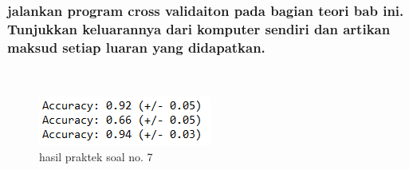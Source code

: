 \subsubsection{jalankan program cross validaiton pada bagian teori bab ini. Tunjukkan keluarannya dari komputer sendiri dan artikan maksud setiap luaran yang didapatkan.}
\hfill\\

	\begin{figure}[H]
	\centering
		\includegraphics[width=5 cm]{figures/1174083/figures4/16.png}
	\caption{hasil praktek soal no. 7}
	\end{figure}

